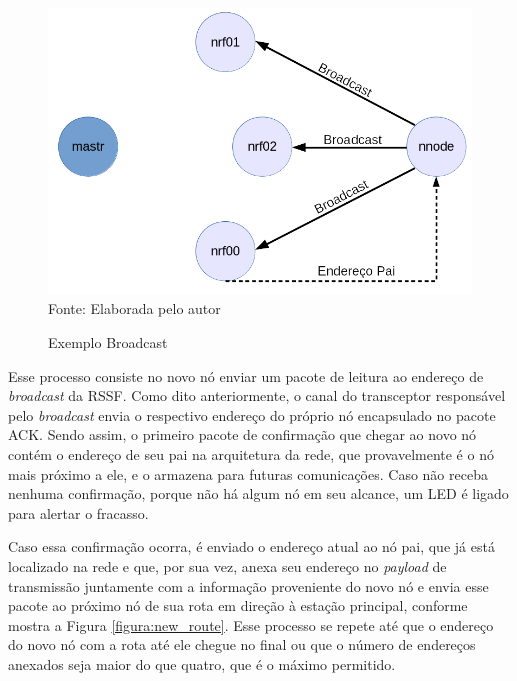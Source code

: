{\begin{figure}[h!]
	\caption{Exemplo Broadcast}
	\centering
	\includegraphics[scale=0.5]{../images/broadcast.png}
	\hspace{\linewidth}
	Fonte: Elaborada pelo autor
	\label{figura:broadcast}
\end{figure}

Esse processo consiste no novo nó enviar um pacote de leitura ao endereço de \textit{broadcast} da RSSF. Como
dito anteriormente, o canal do transceptor responsável pelo \textit{broadcast} envia o respectivo endereço do
próprio nó encapsulado no pacote ACK. Sendo assim, o primeiro pacote de confirmação que chegar ao novo nó
contém o endereço de seu pai na arquitetura da rede, que provavelmente é o nó mais próximo a ele, e o armazena
para futuras comunicações. Caso não receba nenhuma confirmação, porque não há algum nó em seu alcance, um LED
é ligado para alertar o fracasso.

Caso essa confirmação ocorra, é enviado o endereço atual ao nó pai, que já está localizado na rede e que, por
sua vez, anexa seu endereço no \textit{payload} de transmissão juntamente com a informação proveniente do novo
nó e envia esse pacote ao próximo nó de sua rota em direção à estação principal, conforme mostra a Figura
\ref{figura:new_route}. Esse processo se repete até que o endereço do novo nó com a rota até ele chegue no
final ou que o número de endereços anexados seja maior do que quatro, que é o máximo permitido.

}
